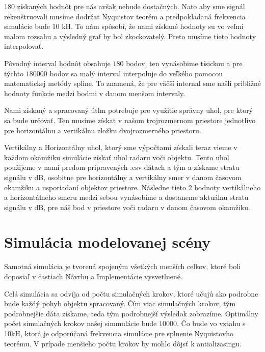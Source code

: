     180 získaných hodnôt pre nás avšak nebude dostačných. Nato aby sme signál rekenštruovali musíme dodržat Nyquistov teorém a predpokladaná frekvencia simulácie bude 10 kH. To nám spôsobí, že nami získané hodnoty su vo veľmi malom rozsahu a výsledný graf by bol zkockovatelý. Preto musíme tieto hodnoty interpolovať.

    Pôvodný interval hodnôt obsahuje $180$ bodov, ten vynásobime tísickou a pre týchto $180 000$ bodov sa malý interval interpoluje do veľkého pomocou matematickej metódy spline. To znamená, že pre väčší internal sme našli približné hodnoty funkcie medzi bodmi v danom menšom intervaly.


    Nami získaný a spracovaný útlm potrebuje pre využitie správny uhol, pre ktorý sa bude určovať. Ten musíme získat v našom trojrozmernom priestore jednotlivo pre horizontálnu a vertikálnu zložku dvojrozmerného priestoru.

    Vertikálny a Horizontálny uhol, ktorý sme výpočtami získali teraz vieme v každom okamžiku simulácie získať uhol radaru voči objektu. Tento uhol použijeme v nami predom pripravených .csv dátach a tým a získame stratu signálu v dB, osobitne pre horizontálny a vertikálny smer v danom časovom okamžiku a usporiadaní objektov priestore. Následne tieto 2 hodnoty vertikálneho a horizontálneho smeru medzi sebou vynásobíme a dostaneme aktuálnu stratu signálu v dB, pre náš bod v priestore voči radaru v danom časovom okamžiku. 
  

  \section{Simulácia modelovanej scény}
    \hspace{0.6cm}Samotná simulácia je tvorená spojeným všetkých menších celkov, ktoré boli doposiaľ v častiach Návrhu a Implementácie vysvetlnené.

    Celá simulácia sa odvíja od počtu simulačných krokov, ktoré učujú ako podrobne bude každý pohyb objektu spracovaný. Čím viac simulačných krokov, tým podrobnejšie dáta získame, teda tým podrobnejší výsledok zobrazíme. Optimálny počet simulačných krokov našej simmulácie bude $10 000$. Čo bude vo vzťahu s 10kH, ktorá je odporúčaná frekvencia simulácie pre splnenie Nyquistovho teorému. V prípade menšieho počtu krokov by mohlo dôjsť k antializasingu.\newline

